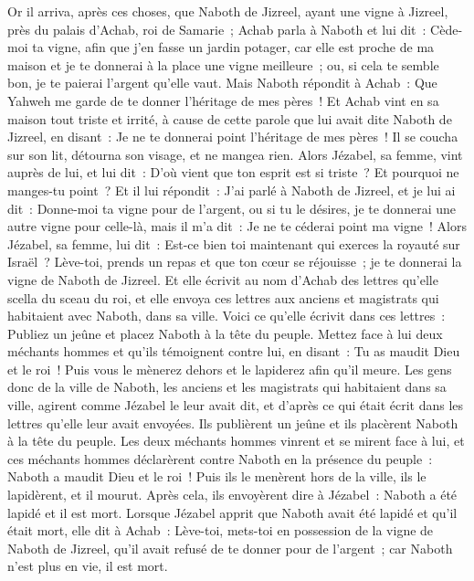 \begin{multicols}{2}
\VerseOne{}Or il arriva, après ces choses, que Naboth de Jizreel, ayant une vigne à Jizreel, près du palais d'Achab, roi de Samarie~;
Achab parla à Naboth et lui dit~: Cède-moi ta vigne, afin que j'en fasse un jardin potager, car elle est proche de ma maison et je te donnerai à la place une vigne meilleure~; ou, si cela te semble bon, je te paierai l'argent qu'elle vaut.
Mais Naboth répondit à Achab~: Que Yahweh me garde de te donner l'héritage de mes pères~!
Et Achab vint en sa maison tout triste et irrité, à cause de cette parole que lui avait dite Naboth de Jizreel, en disant~: Je ne te donnerai point l'héritage de mes pères~! Il se coucha sur son lit, détourna son visage, et ne mangea rien.
Alors Jézabel, sa femme, vint auprès de lui, et lui dit~: D'où vient que ton esprit est si triste~? Et pourquoi ne manges-tu point~?
Et il lui répondit~: J'ai parlé à Naboth de Jizreel, et je lui ai dit~: Donne-moi ta vigne pour de l'argent, ou si tu le désires, je te donnerai une autre vigne pour celle-là, mais il m'a dit~: Je ne te céderai point ma vigne~!
Alors Jézabel, sa femme, lui dit~: Est-ce bien toi maintenant qui exerces la royauté sur Israël~? Lève-toi, prends un repas et que ton cœur se réjouisse~; je te donnerai la vigne de Naboth de Jizreel.
Et elle écrivit au nom d'Achab des lettres qu'elle scella du sceau du roi, et elle envoya ces lettres aux anciens et magistrats qui habitaient avec Naboth, dans sa ville.
Voici ce qu'elle écrivit dans ces lettres~: Publiez un jeûne et placez Naboth à la tête du peuple.
Mettez face à lui deux méchants hommes et qu'ils témoignent contre lui, en disant~: Tu as maudit Dieu et le roi~! Puis vous le mènerez dehors et le lapiderez afin qu'il meure.
Les gens donc de la ville de Naboth, les anciens et les magistrats qui habitaient dans sa ville, agirent comme Jézabel le leur avait dit, et d'après ce qui était écrit dans les lettres qu'elle leur avait envoyées.
Ils publièrent un jeûne et ils placèrent Naboth à la tête du peuple.
Les deux méchants hommes vinrent et se mirent face à lui, et ces méchants hommes déclarèrent contre Naboth en la présence du peuple~: Naboth a maudit Dieu et le roi~! Puis ils le menèrent hors de la ville, ils le lapidèrent, et il mourut.
Après cela, ils envoyèrent dire à Jézabel~: Naboth a été lapidé et il est mort.
Lorsque Jézabel apprit que Naboth avait été lapidé et qu'il était mort, elle dit à Achab~: Lève-toi, mets-toi en possession de la vigne de Naboth de Jizreel, qu'il avait refusé de te donner pour de l'argent~; car Naboth n'est plus en vie, il est mort.

\end{multicols}
